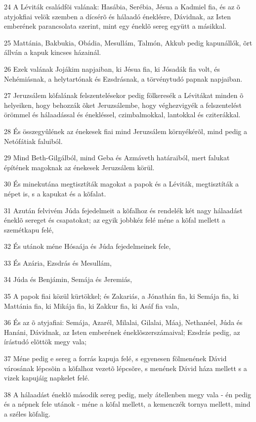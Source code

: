 \par 24 A Léviták családfõi valának: Hasábia, Serébia, Jésua a Kadmiel fia, és az õ atyjokfiai velök szemben a dícsérõ és hálaadó éneklésre, Dávidnak, az Isten emberének parancsolata szerint, mint egy éneklõ sereg együtt a másikkal.
\par 25 Mattánia, Bakbukia, Obádia, Mesullám, Talmón, Akkub pedig kapunállók, õrt állván a kapuk kincses házainál.
\par 26 Ezek valának Jojákim napjaiban, ki Jésua fia, ki Jósadák fia volt, és Nehémiásnak, a helytartónak és Ezsdrásnak, a törvénytudó papnak  napjaiban.
\par 27 Jeruzsálem kõfalának felszentelésekor pedig fölkeresék a Lévitákat minden õ helyeiken, hogy behozzák õket Jeruzsálembe, hogy véghezvigyék a felszentelést örömmel és hálaadással és énekléssel, czimbalmokkal, lantokkal és cziterákkal.
\par 28 És összegyûlének az énekesek fiai mind Jeruzsálem környékérõl, mind pedig a Netófátiak faluiból.
\par 29 Mind Beth-Gilgálból, mind Geba és Azmáveth határaiból, mert falukat építének magoknak az énekesek Jeruzsálem körül.
\par 30 És minekutána megtisztíták magokat a papok és a Léviták, megtisztíták a népet is, s a kapukat és a kõfalat.
\par 31 Azután felvivém Júda fejedelmeit a kõfalhoz és rendelék két nagy hálaadást éneklõ sereget és csapatokat; az egyik jobbkéz felé méne a kõfal mellett a szemétkapu felé,
\par 32 És utánok méne Hósaája és Júda fejedelmeinek fele,
\par 33 És Azária, Ezsdrás és Mesullám,
\par 34 Júda és Benjámin, Semája és Jeremiás,
\par 35 A papok fiai közül kürtökkel; és Zakariás, a Jónathán fia, ki Semája fia, ki Mattánia fia, ki Mikája fia, ki Zakkur fia, ki Asáf fia vala,
\par 36 És az õ atyjafiai: Semája, Azarél, Milalai, Gilalai, Máaj, Nethanéel, Júda és Hanáni, Dávidnak, az Isten emberének éneklõszerszámaival; Ezsdrás pedig, az írástudó elõttök megy vala;
\par 37 Méne pedig e sereg a forrás kapuja felé, s egyenesen fölmenének Dávid városának lépcsõin a kõfalhoz vezetõ lépcsõre, s menének Dávid háza mellett s a vizek kapujáig napkelet felé.
\par 38 A hálaadást éneklõ második sereg pedig, mely átellenben megy vala - én pedig és a népnek fele utánok - méne a kõfal mellett, a kemenczék tornya mellett, mind a széles kõfalig.
